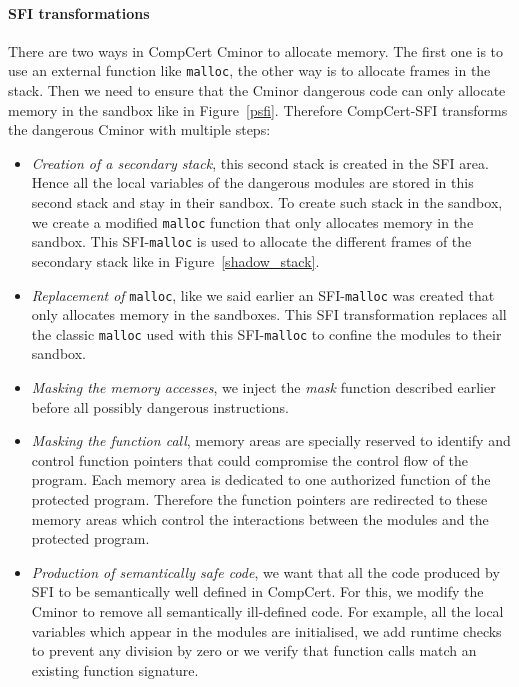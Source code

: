 \documentclass[11pt]{sdm}
\begin{document}
\paragraph{SFI transformations}
\label{par:SFI transformations}
There are two ways in CompCert Cminor to allocate memory. The first one is to use an external function like \texttt{malloc}, the other way is to allocate frames in the stack. Then we need to ensure that the Cminor dangerous code can only allocate memory in the sandbox like in Figure~\ref{psfi}. Therefore CompCert-SFI transforms the dangerous Cminor with multiple steps:
\begin{itemize}
	\item \textit{Creation of a secondary stack}, this second stack is created in the SFI area. Hence all the local variables of the dangerous modules are stored in this second stack and stay in their sandbox. To create such stack in the sandbox, we create a modified \texttt{malloc} function that only allocates memory in the sandbox. This SFI-\texttt{malloc} is used to allocate the different frames of the secondary stack like in Figure~\ref{shadow_stack}. 
	\item \textit{Replacement of} \texttt{malloc}, like we said earlier an SFI-\texttt{malloc} was created that only allocates memory in the sandboxes. This SFI transformation replaces all the classic \texttt{malloc} used with this SFI-\texttt{malloc} to confine the modules to their sandbox.
	\item \textit{Masking the memory accesses}, we inject the \textit{mask} function described earlier before all possibly dangerous instructions.
	\item \textit{Masking the function call}, memory areas are specially reserved to identify and control function pointers that could compromise the control flow of the program. Each memory area is dedicated to one authorized function of the protected program. Therefore the function pointers are redirected to these memory areas which control the interactions between the modules and the protected program.
	\item \textit{Production of semantically safe code}, we want that all the code produced by SFI to be semantically well defined in CompCert. For this, we modify the Cminor to remove all semantically ill-defined code. For example, all the local variables which appear in the modules are initialised, we add runtime checks to prevent any division by zero or we verify that function calls match an existing function signature.
\end{itemize}
\end{document}
